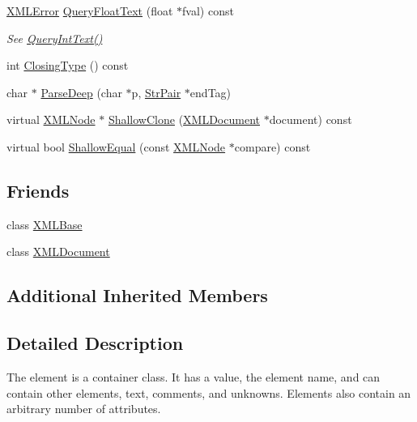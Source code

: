\begin{DoxyCompactItemize}
\hyperlink{namespacetinyxml2_a1fbf88509c3ac88c09117b1947414e08}{X\+M\+L\+Error} \hyperlink{classtinyxml2_1_1_x_m_l_element_a11fa26e1dbca88e973964c1d9b597658}{Query\+Float\+Text} (float $\ast$fval) const 
\begin{DoxyCompactList}\small\item\em See \hyperlink{classtinyxml2_1_1_x_m_l_element_a71327c9a9d8840562bd204f46d0a7189}{Query\+Int\+Text()} \end{DoxyCompactList}\item 
int \hyperlink{classtinyxml2_1_1_x_m_l_element_a2e3d9f938307a05963d7c4b8cd55754e}{Closing\+Type} () const 
\item 
char $\ast$ \hyperlink{classtinyxml2_1_1_x_m_l_element_aaafdd2a5618abe80a2c1839ad3ccd492}{Parse\+Deep} (char $\ast$p, \hyperlink{classtinyxml2_1_1_str_pair}{Str\+Pair} $\ast$end\+Tag)
\item 
virtual \hyperlink{classtinyxml2_1_1_x_m_l_node}{X\+M\+L\+Node} $\ast$ \hyperlink{classtinyxml2_1_1_x_m_l_element_a85d85e32c18863fff1eeed53ae1ce23d}{Shallow\+Clone} (\hyperlink{classtinyxml2_1_1_x_m_l_document}{X\+M\+L\+Document} $\ast$document) const 
\item 
virtual bool \hyperlink{classtinyxml2_1_1_x_m_l_element_a25d51a2aad92625c78441457d58c85bc}{Shallow\+Equal} (const \hyperlink{classtinyxml2_1_1_x_m_l_node}{X\+M\+L\+Node} $\ast$compare) const 
\end{DoxyCompactItemize}
\subsection*{Friends}
\begin{DoxyCompactItemize}
\item 
class \hyperlink{classtinyxml2_1_1_x_m_l_element_a449202cfc89e7ae5c2f81995476f9ec1}{X\+M\+L\+Base}
\item 
class \hyperlink{classtinyxml2_1_1_x_m_l_element_a4eee3bda60c60a30e4e8cd4ea91c4c6e}{X\+M\+L\+Document}
\end{DoxyCompactItemize}
\subsection*{Additional Inherited Members}


\subsection{Detailed Description}
The element is a container class. It has a value, the element name, and can contain other elements, text, comments, and unknowns. Elements also contain an arbitrary number of attributes. 


